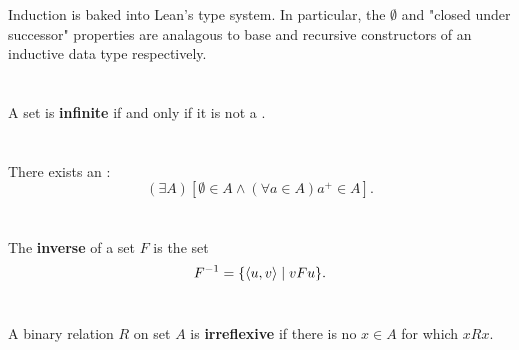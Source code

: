 \documentclass{report}
\begin{document}

  \begin{note}
    Induction is baked into Lean's type system.
    In particular, the $\emptyset$ and "closed under successor" properties are
      analagous to base and recursive constructors of an inductive data type
      respectively.
  \end{note}

\section{}%

  A set is \textbf{infinite} if and only if it is not a
    .

\section{}%

  There exists an :
    $$(\exists A)\left[
      \emptyset \in A \land (\forall a \in A) a^+ \in A\right].$$



\section{}%

  The \textbf{inverse} of a set $F$ is the set
    $$F^{-1} = \{\left< u, v \right> \mid vFu\}.$$



\section{}%

  A binary relation $R$ on set $A$ is \textbf{irreflexive} if there is no
    $x \in A$ for which $xRx$.


\section{}
\end{document}
